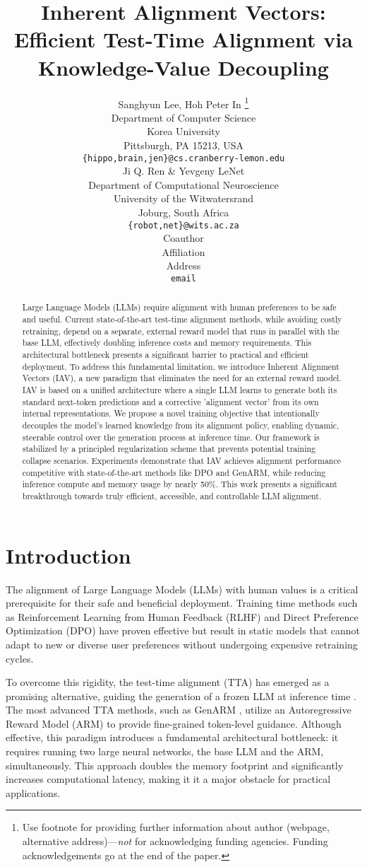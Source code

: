 \documentclass{article} %
\title{Inherent Alignment Vectors: Efficient Test-Time Alignment via Knowledge-Value Decoupling}
\author{Sanghyun Lee, Hoh Peter In \thanks{ Use footnote for providing further information
about author (webpage, alternative address)---\emph{not} for acknowledging
funding agencies.  Funding acknowledgements go at the end of the paper.} \\
Department of Computer Science\\
Korea University\\
Pittsburgh, PA 15213, USA \\
\texttt{\{hippo,brain,jen\}@cs.cranberry-lemon.edu} \\
\And
Ji Q. Ren \& Yevgeny LeNet \\
Department of Computational Neuroscience \\
University of the Witwatersrand \\
Joburg, South Africa \\
\texttt{\{robot,net\}@wits.ac.za} \\
\AND
Coauthor \\
Affiliation \\
Address \\
\texttt{email}
}
\begin{document}
\maketitle

\begin{abstract}
Large Language Models (LLMs) require alignment with human preferences to be safe and useful. Current state-of-the-art test-time alignment methods, while avoiding costly retraining, depend on a separate, external reward model that runs in parallel with the base LLM, effectively doubling inference costs and memory requirements. This architectural bottleneck presents a significant barrier to practical and efficient deployment. To address this fundamental limitation, we introduce Inherent Alignment Vectors (IAV), a new paradigm that eliminates the need for an external reward model. IAV is based on a unified architecture where a single LLM learns to generate both its standard next-token predictions and a corrective 'alignment vector' from its own internal representations. We propose a novel training objective that intentionally decouples the model's learned knowledge from its alignment policy, enabling dynamic, steerable control over the generation process at inference time. Our framework is stabilized by a principled regularization scheme that prevents potential training collapse scenarios. Experiments demonstrate that IAV achieves alignment performance competitive with state-of-the-art methods like DPO and GenARM, while reducing inference compute and memory usage by nearly 50\%. This work presents a significant breakthrough towards truly efficient, accessible, and controllable LLM alignment.
\end{abstract}
\section{Introduction}

The alignment of Large Language Models (LLMs) with human values is a critical prerequisite for their safe and beneficial deployment. Training time methods such as Reinforcement Learning from Human Feedback (RLHF) \citep{ouyang2022training} and Direct Preference Optimization (DPO) \citep{rafailov2023direct} have proven effective but result in static models that cannot adapt to new or diverse user preferences without undergoing expensive retraining cycles.

To overcome this rigidity, the test-time alignment (TTA) has emerged as a promising alternative, guiding the generation of a frozen LLM at inference time \citep{khanov2024args, xu2024genarm}. The most advanced TTA methods, such as GenARM \citep{xu2024genarm}, utilize an Autoregressive Reward Model (ARM) to provide fine-grained token-level guidance. Although effective, this paradigm introduces a fundamental architectural bottleneck: it requires running two large neural networks, the base LLM and the ARM, simultaneously. This approach doubles the memory footprint and significantly increases computational latency, making it it a major obstacle for practical applications.
\end{document}
